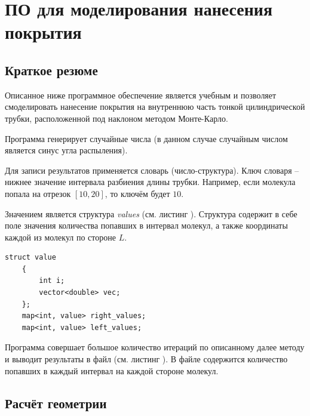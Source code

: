 \documentclass[../AISTR.tex]{subfiles}
\begin{document}
\section{ПО для моделирования нанесения покрытия}
\subsection{Краткое резюме}\label{par:resume}
Описанное ниже программное обеспечение является учебным и позволяет смоделировать нанесение покрытия на внутреннюю часть тонкой цилиндрической трубки, расположенной под наклоном методом Монте-Карло.

Программа генерирует случайные числа (в данном случае случайным числом является синус угла распыления). 

Для записи результатов применяется словарь (число-структура).
Ключ словаря -- нижнее значение интервала разбиения длины трубки. Например, если молекула попала на отрезок $\left[10, 20\right]$, то ключём будет $10$. 

Значением является структура \textit{values} (см. листинг ). Структура содержит в себе поле значения количества попавших в интервал молекул, а также координаты каждой из молекул по стороне $L$.



\begin{lstlisting}[caption=Запись значений,captionpos=b, label={list:map}]
	struct value
	{
		int i;
		vector<double> vec;
	};
	map<int, value> right_values;
	map<int, value> left_values;
\end{lstlisting}

Программа совершает большое количество итераций по описанному далее методу и выводит результаты в файл (см. листинг ). В файле содержится количество попавших в каждый интервал на каждой стороне молекул. 
\subsection{Расчёт геометрии}\label{par:geom}
\end{document}
